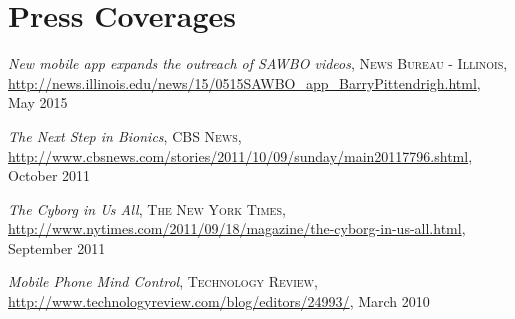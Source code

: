 \section{\sc Press Coverages}
\emph{New mobile app expands the outreach of SAWBO videos}, \textsc{News Bureau - Illinois},
\url{http://news.illinois.edu/news/15/0515SAWBO_app_BarryPittendrigh.html},
May 2015
\vspace*{-2.5mm}

\emph{The Next Step in Bionics}, \textsc{CBS News},
\url{http://www.cbsnews.com/stories/2011/10/09/sunday/main20117796.shtml},
October 2011
\vspace*{-2.5mm}

\emph{The Cyborg in Us All}, \textsc{The New York Times},
\url{http://www.nytimes.com/2011/09/18/magazine/the-cyborg-in-us-all.html},
September 2011
\vspace*{-2.5mm}

\emph{Mobile Phone Mind Control}, \textsc{Technology Review},
\url{http://www.technologyreview.com/blog/editors/24993/}, March 2010
\vspace*{-2.5mm}
